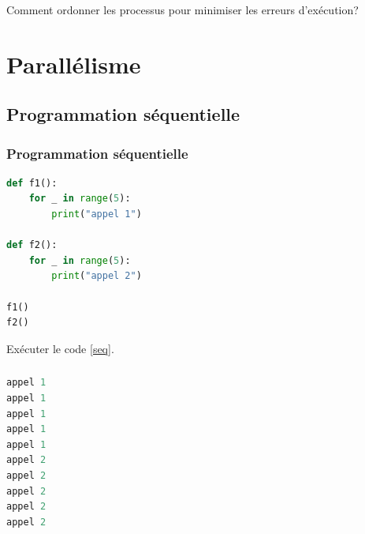 \documentclass[svgnames,11pt]{beamer}
\begin{document}
\begin{frame}
    \frametitle{}

    \begin{framed}
        \centering Comment ordonner les processus pour minimiser les erreurs d'exécution?
    \end{framed}

\end{frame}
\section{Parallélisme}
\subsection{Programmation séquentielle}
\begin{frame}[fragile]
    \frametitle{Programmation séquentielle}

    \begin{center}
        \begin{lstlisting}[language=Python , basicstyle=\ttfamily\small, xleftmargin=2em, xrightmargin=2em]
def f1():
    for _ in range(5):
        print("appel 1")

def f2():
    for _ in range(5):
        print("appel 2")

f1()
f2()
\end{lstlisting}
        \label{seq}
    \end{center}
    \begin{activite}
        Exécuter le code \ref{seq}.
    \end{activite}
\end{frame}
\begin{frame}[fragile]
    \frametitle{}

    \begin{center}
        \begin{lstlisting}[language=Python , basicstyle=\ttfamily\small, xleftmargin=2em, xrightmargin=2em]
appel 1
appel 1
appel 1
appel 1
appel 1
appel 2
appel 2
appel 2
appel 2
appel 2
\end{lstlisting}
    \end{center}

\end{frame}
\end{document}
